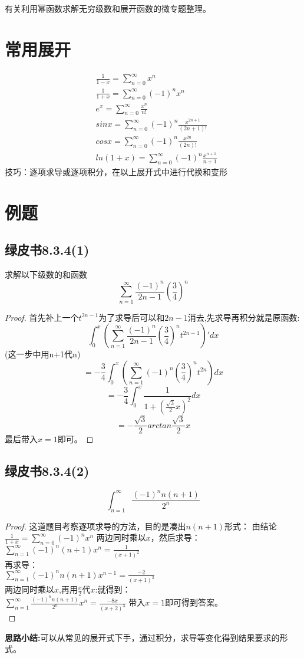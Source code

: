 \documentclass[UTF8]{ctexart}
\begin{document}
\noindent
有关利用幂函数求解无穷级数和展开函数的微专题整理。
\section{常用展开}
\begin{align*}\label{2}
	& \frac{1}{1-x} = \sum_{n=0}^{\infty} x^n\\
	& \frac{1}{1+x} = \sum_{n=0}^{\infty} (-1)^nx^n\\
	& e^x=\sum_{n=0}^{\infty} \frac{x^n}{n!} \\
	& sin{x}=\sum_{n=0}^{\infty} (-1)^n \frac{x^{2n+1}}{(2n+1)!}\\
	& cos{x}=\sum_{n=0}^{\infty} (-1)^n \frac{x^{2n}}{(2n)!}\\
	& ln(1+x)=\sum_{n=0}^{\infty} (-1)^n \frac{x^{n+1}}{n+1}
\end{align*}
技巧：逐项求导或逐项积分，在以上展开式中进行代换和变形
\section{例题}
\subsection{绿皮书8.3.4(1)}
求解以下级数的和函数
$$\sum_{n=1}^{\infty} \frac{(-1)^n}{2n-1} (\frac{3}{4})^n$$
\begin{proof}
首先补上一个$t^{2n-1}$为了求导后可以和$2n-1$消去,先求导再积分就是原函数:\\
$$\int_{0}^{x}(\sum_{n=1}^{\infty} \frac{(-1)^n}{2n-1} (\frac{3}{4})^n t^{2n-1})'dx$$(这一步中用n+1代n)
$$=-\frac{3}{4} \int_{0}^{x}(\sum_{n=1}^{\infty} (-1)^n (\frac{3}{4})^n t^{2n})dx$$
$$=-\frac{3}{4}\int_{0}^{x} \frac{1}{1+(\frac{\sqrt{3}}{2}x)^2}dx$$
$$=-\frac{\sqrt{3}}{2} arctan{\frac{\sqrt{3}}{2}x}$$
最后带入$x=1$即可。
\end{proof}
\subsection{绿皮书8.3.4(2)}
$$\int_{n=1}^{\infty} \frac{(-1)^n n(n+1)}{2^n}$$
\begin{proof}
这道题目考察逐项求导的方法，目的是凑出$n(n+1)$形式：
由结论$\frac{1}{1+x} = \sum_{n=0}^{\infty} (-1)^nx^n$
两边同时乘以$x$，然后求导：\\$\sum_{n=1}^{\infty} (-1)^n(n+1)x^n = \frac{1}{(x+1)^2}$\\
再求导：\\
$\sum_{n=1}^{\infty} (-1)^nn(n+1)x^{n-1} = \frac{-2}{(x+1)^3}$\\
两边同时乘以$x$,再用$\frac{x}{2}$代$x$:就得到：\\
$\sum_{n=1}^{\infty} \frac{(-1)^nn(n+1)}{2^n}x^n=\frac{-8x}{(x+2)^3}$
带入$x=1$即可得到答案。\\
\end{proof}
\textbf{思路小结:}可以从常见的展开式下手，通过积分，求导等变化得到结果要求的形式。
\\
\end{document}
